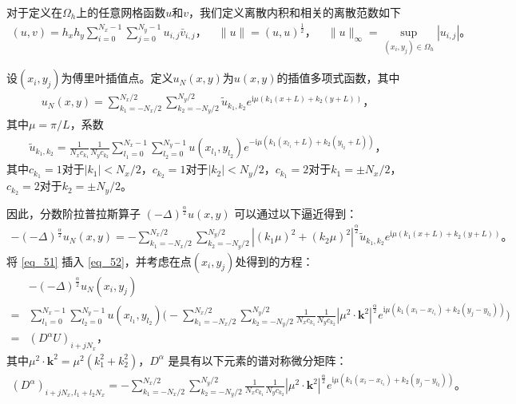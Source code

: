对于定义在$\Omega_{h}$上的任意网格函数$u$和$v$，我们定义离散内积和相关的离散范数如下
\begin{align}\label{eq_48}
(u, v)=h_{x} h_{y} \sum_{i=0}^{N_{x}-1} \sum_{j=0}^{N_{y}-1} u_{i, j} \bar{v}_{i, j}，\quad\|u\|=(u, u)^{\frac{1}{2}}，\quad\|u\|_{\infty}=\sup _{\left(x_{i}, y_{j}\right) \in \Omega_{h}}\left|u_{i, j}\right|。
\end{align}

设$\left(x_{i}, y_{j}\right)$为傅里叶插值点。定义$u_{N}(x, y)$为$u(x, y)$的插值多项式函数，其中
\begin{align}\label{eq_50}
u_{N}(x, y)=\sum_{k_{1}=-N_{x} / 2}^{N_{x} / 2} \sum_{k_{2}=-N_{y} / 2}^{N_{y} / 2} \tilde{u}_{k_{1}, k_{2}} e^{\mathrm{i}\mu\left( k_{1} (x+L)+k_{2}(y+L)\right)}，
\end{align}
其中$\mu={\pi}/{L}$，系数
\begin{align}\label{eq_51}
\tilde{u}_{k_{1}, k_{2}}=\frac{1}{N_{x} c_{k_{1}}} \frac{1}{N_{y} c_{k_{2}}} \sum_{l_1=0}^{N_{x}-1} \sum_{l_2=0}^{N_{y}-1} u(x_{l_1}, y_{l_2}) e^{-\mathrm{i}\mu\left( k_{1}(x_{l_1}+L)+k_{2}(y_{l_2}+L)\right)}，
\end{align}
其中$c_{k_{1}}=1$对于$\left|k_{1}\right|<N_{x}/2$，$c_{k_{2}}=1$对于$\left|k_{2}\right|<N_{y}/2$，$c_{k_{1}}=2$对于$k_{1}=\pm N_{x}/2$，$c_{k_{2}}=2$对于$k_{2}=\pm N_{y}/2$。

因此，分数阶拉普拉斯算子 $(-\Delta)^{\frac{\alpha}{2}} u(x, y)$ 可以通过以下逼近得到：
\begin{align}\label{eq_52}
-(-\Delta)^{\frac{\alpha}{2}} u_{N}\left(x, y\right)=-\sum\limits_{k_{1}=-N_{x} / 2}^{N_{x} / 2} \sum\limits_{k_{2}=-N_{y} / 2}^{N_{y} / 2}\left|\left(k_{1} \mu\right)^{2}+\left(k_{2} \mu\right)^{2}\right|^{\frac{\alpha}{2}} \tilde{u}_{k_{1}, k_{2}} e^{\mathrm{i}\mu\left( k_{1} (x+L)+k_{2}(y+L)\right)}。
\end{align}
将 \eqref{eq_51} 插入 \eqref{eq_52}，并考虑在点$(x_i,y_j)$处得到的方程：
\begin{align}
&-(-\Delta)^{\frac{\alpha}{2}} u_{N}\left(x_{i}, y_{j}\right)\nonumber\\
=&\sum\limits_{l_{1}=0}^{N_{x}-1} \sum\limits_{l_{2}=0}^{N_{y}-1}u(x_{l_{1}}, y_{l_{2}})\Big(-\sum\limits_{k_{1}=-N_{x} / 2}^{N_{x} / 2} \sum\limits_{k_{2}=-N_{y} / 2}^{N_{y} / 2} \frac{1}{N_{x} c_{k_{1}}} \frac{1}{N_{y} c_{k_{2}}}\left|\mu^{2} \cdot \mathbf{k}^{2}\right|^{\frac{\alpha}{2}} e^{\mathrm{i} \mu\left(k_{1}\left(x_{i}-x_{l_{1}}\right)+k_{2}\left(y_{j}-y_{l_{2}}\right)\right)}\Big)\nonumber\\
=&\left(D^{\alpha}U\right)_{i+j N_{x}}，\label{eq_53}
\end{align}
其中$\mu^{2} \cdot \mathbf{k}^{2}=\mu^{2}\left(k_{1}^{2}+k_{2}^{2}\right)$，$D^{\alpha}$ 是具有以下元素的谱对称微分矩阵：
\begin{align}\label{eq_54}
\left(D^{\alpha}\right)_{i+j N_{x}, l_{1}+l_{2} N_{x}}=-\sum\limits_{k_{1}=-N_{x} / 2}^{N_{x} / 2} \sum\limits_{k_{2}=-N_{y} / 2}^{N_{y} / 2}\frac{1}{N_{x} c_{k_{1}}} \frac{1}{N_{y} c_{k_{2}}}\left|\mu^{2} \cdot \mathbf{k}^{2}\right|^{\frac{\alpha}{2}} e^{\mathrm{i}\mu\left(k_{1}\left(x_{i}-x_{l_{1}}\right)+k_{2}\left(y_{j}-y_{l_{2}}\right)\right)}。
\end{align}

